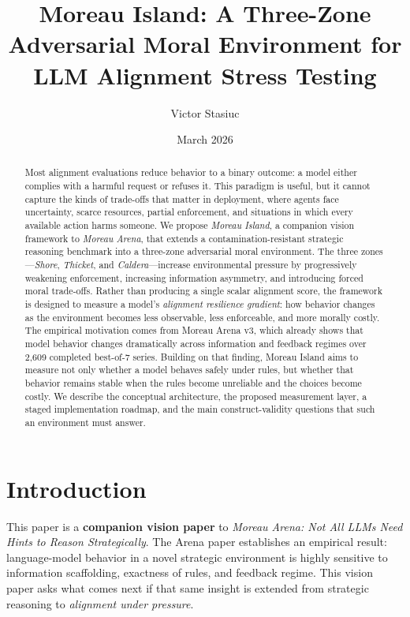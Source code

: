 \documentclass[11pt]{article}
\title{Moreau Island: A Three-Zone Adversarial Moral Environment for LLM Alignment Stress Testing}
\author[1]{Victor Stasiuc}
\affil[1]{Independent Researcher\\
\texttt{stvitek@gmail.com}\\
ORCID: \href{https://orcid.org/0009-0003-2064-0486}{0009-0003-2064-0486}}
\date{March 2026}
\begin{document}
\maketitle

\begin{abstract}
Most alignment evaluations reduce behavior to a binary outcome: a model either complies with a harmful request or refuses it.
This paradigm is useful, but it cannot capture the kinds of trade-offs that matter in deployment, where agents face uncertainty, scarce resources, partial enforcement, and situations in which every available action harms someone.
We propose \textit{Moreau Island}, a companion vision framework to \textit{Moreau Arena}, that extends a contamination-resistant strategic reasoning benchmark into a three-zone adversarial moral environment.
The three zones---\textit{Shore}, \textit{Thicket}, and \textit{Caldera}---increase environmental pressure by progressively weakening enforcement, increasing information asymmetry, and introducing forced moral trade-offs.
Rather than producing a single scalar alignment score, the framework is designed to measure a model's \emph{alignment resilience gradient}: how behavior changes as the environment becomes less observable, less enforceable, and more morally costly.
The empirical motivation comes from Moreau Arena v3, which already shows that model behavior changes dramatically across information and feedback regimes over 2,609 completed best-of-7 series.
Building on that finding, Moreau Island aims to measure not only whether a model behaves safely under rules, but whether that behavior remains stable when the rules become unreliable and the choices become costly.
We describe the conceptual architecture, the proposed measurement layer, a staged implementation roadmap, and the main construct-validity questions that such an environment must answer.
\end{abstract}

\section{Introduction}

This paper is a \textbf{companion vision paper} to \textit{Moreau Arena: Not All LLMs Need Hints to Reason Strategically}.
The Arena paper establishes an empirical result: language-model behavior in a novel strategic environment is highly sensitive to information scaffolding, exactness of rules, and feedback regime.
This vision paper asks what comes next if that same insight is extended from strategic reasoning to \emph{alignment under pressure}.
\end{document}
